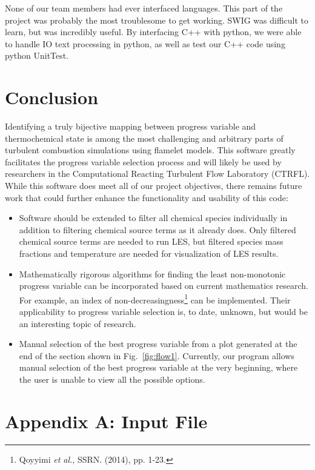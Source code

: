 \documentclass[11pt]{article}
\begin{document}
None of our team members had ever interfaced languages. This part of
the project was probably the most troublesome to get working. SWIG was
difficult to learn, but was incredibly useful. By interfacing C++ with
python, we were able to handle IO text processing in python, as well
as test our C++ code using python UnitTest.

\section{Conclusion}
Identifying a truly bijective mapping between progress variable and
thermochemical state is among the most challenging and arbitrary parts
of turbulent combustion simulations using flamelet models. This
software greatly facilitates the progress variable selection process
and will likely be used by researchers in the Computational Reacting
Turbulent Flow Laboratory (CTRFL). While this software does meet all
of our project objectives, there remains future work that could
further enhance the functionality and usability of this code:

\begin{itemize}
\item Software should be extended to filter all chemical species
  individually in addition to filtering chemical source terms as it
  already does. Only filtered chemical source terms are needed to run
  LES, but filtered species mass fractions and temperature are needed
  for visualization of LES results.
\item Mathematically rigorous algorithms for finding the least
  non-monotonic progress variable can be incorporated based on current
  mathematics research. For example, an index of
  non-decreasingness\footnote{Qoyyimi \textit{et al.}, SSRN. (2014),
    pp. 1-23.} can be implemented. Their applicability to progress
  variable selection is, to date, unknown, but would be an interesting
  topic of research.
\item Manual selection of the best progress variable from a plot
  generated at the end of the section shown in
  Fig.~\ref{fig:flow1}. Currently, our program allows manual selection
  of the best progress variable at the very beginning, where the user
  is unable to view all the possible options.
\end{itemize}


\clearpage
\section*{Appendix A: Input File}
\end{document}
